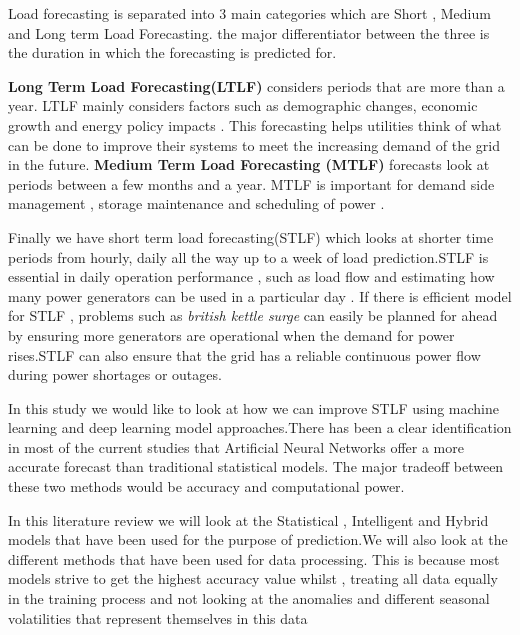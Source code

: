 Load forecasting is separated into 3 main categories which are Short , Medium and Long term Load Forecasting. the major differentiator between the three is the duration in which the forecasting is predicted for.

\textbf{Long Term Load Forecasting(LTLF)} considers periods that are more than a year. LTLF mainly considers factors such as demographic changes, economic growth and energy policy impacts \cite{IBM_loadforecasting}. This forecasting helps utilities think of what can be done to improve their systems to meet the increasing demand of the grid in the future.
\textbf{Medium Term Load Forecasting (MTLF)} forecasts look at periods between a few months and a year. MTLF is important for demand side management  , storage maintenance and scheduling of power \cite{han2018enhanced}.

Finally we have short term load forecasting(STLF) which looks at shorter time periods from hourly, daily all the way up to a week of load prediction.STLF is essential in daily operation performance , such as load flow and estimating how many power generators can be used in a particular day \cite{shohan2022forecasting}. If there is efficient model for STLF  , problems such as \textit{british kettle surge} can easily be planned for ahead by ensuring more generators are operational when the demand for power rises.STLF can also ensure that the grid has a reliable continuous power flow during power shortages or outages\cite{tarmanini2023short}.

In this study we would like to look at how we can improve STLF using machine learning and deep learning model approaches.There has been a clear identification in most of the current studies that Artificial Neural Networks offer a more accurate forecast than traditional statistical models. The major tradeoff between these two methods would be accuracy and computational power.

 In this literature  review we will look at the Statistical , Intelligent and Hybrid models that have been used for the purpose of prediction.We will also look at the different methods that have been used for data processing. This is because most models strive to get the highest accuracy value whilst , treating all data equally in the training process and not looking at the anomalies and different seasonal volatilities that represent themselves in this data \cite{wang2023improving}
 
 
 
